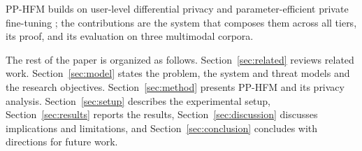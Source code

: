 PP-HFM builds on user-level differential privacy \cite{ref11} and
parameter-efficient private fine-tuning \cite{ref12, ref13}; the
contributions are the system that composes them across all tiers, its proof,
and its evaluation on three multimodal corpora.

The rest of the paper is organized as follows. Section~\ref{sec:related}
reviews related work. Section~\ref{sec:model} states the problem, the system
and threat models and the research objectives. Section~\ref{sec:method}
presents PP-HFM and its privacy analysis. Section~\ref{sec:setup} describes the
experimental setup, Section~\ref{sec:results} reports the results,
Section~\ref{sec:discussion} discusses implications and limitations, and
Section~\ref{sec:conclusion} concludes with directions for future work.
